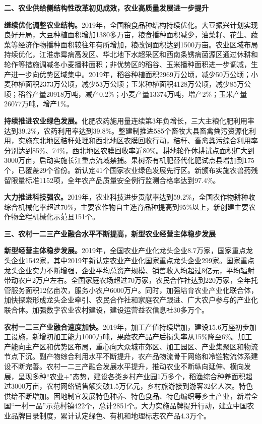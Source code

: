 \documentclass{progbookcn}
\begin{document}
\textbf{二、农业供给侧结构性改革初见成效，农业高质量发展进一步提升}
   
   \textbf{继续优化调整农业结构。}2019年，全国粮食品种结构持续优化。大豆振兴计划实现良好开局，大豆种植面积增加1380多万亩，粮食播种面积减少，油菜籽、花生、蔬菜等经济作物播种面积较往年有所增加，粮改饲面积达到1500万亩。农业区域布局持续优化，江淮赤霉病高发区、华北地下水超采区和西南条锈病菌源区通过休耕和轮作等措施调减冬小麦播种面积；非优势区的稻谷、玉米播种面积进一步调减，生产进一步向优势区域集中。2019年，稻谷种植面积2969万公顷，减少50万公顷；小麦种植面积2373万公顷，减少53万公顷；玉米种植面积4128万公顷，减少85万公顷；稻谷产量20918万吨，减产0.2\%；小麦产量13374万吨，增产2\%；玉米产量26077万吨，增产1\%。
    
    \textbf{持续推进农业绿色发展。}化肥农药施用量连续第3年负增长，三大主粮化肥利用率达到39.2\%，农药利用率达到39.8\%。整建制推进585个畜牧大县畜禽粪污资源化利用，实施东北地区秸秆处理和西北地区农膜回收行动，秸秆、畜禽粪污综合利用率分别达到85\%、74\%，西北地区农膜回收率近80\%。耕地轮作休耕试点面积扩大到3000万亩，启动实施长江重点流域禁捕。果树茶有机肥替代化肥试点县增加到175个，已覆盖29个省份。新认定41个国家农业绿色发展先行区。新颁布实施农兽药残留限量标准1152项，全年农产品质量安全例行监测合格率达到97.4\%。
    
    \textbf{大力推进科技强农。}2019年，农业科技进步贡献率达到59.2\%，全国农作物耕种收综合机械化率超过70\%，主要农作物自主选育品种提高到95\%以上，新创建主要农作物全程机械化示范县151个。

\textbf{三、农村一二三产业融合水平不断提高，新型农业经营主体稳步发展}

    \textbf{新型经营主体稳步发展。}2019年，全国农业产业化龙头企业8.7万家，国家重点龙头企业1542家，其中2019年新认定农业产业化国家重点龙头企业299家。国家重点龙头企业实力不断增强，企业平均总资产规模、销售收入均超过8亿元，平均辐射带动农户2万户左右。全国家庭农场超过70万家，农民合作社达到220万家，全年托管服务面积12亿亩次，服务小农户6000万户。同时，加强培育农业产业化联合体，加快探索形成龙头企业牵引、农民合作社和家庭农产跟进、广大农户参与的产业化联合体。加强数字农业农村建设，建设运营益农信息社30多万个。

    \textbf{农村一二三产业融合速度加快。}2019年，加工产值持续增加，建设15.6万座初步加工设施，新增初加工能力1000万吨，果蔬农产品产后损失率从15\%降至6\%。加工产能向主产区和优势区布局，重心向大众城市郊区、加工园区、产业集聚区和物流节点下沉。副产物综合利用水平不断提升，农产品物流骨干网络和冷链物流体系建设不断完善。农村一二三产融合发展水平提升，推动农业不断纵向延伸、横向发展，呈现多种“农业+”态势，建设各类乡村产业园1万多个，稻渔综合种养面积超过3000万亩，农村网络销售额突破1.5万亿元，乡村旅游接到游客32亿人次。特色供给不断增加。因地制宜发展特色种养、特色食品、特色编织等乡土产业，新增全国“一村一品”示范村镇422个，总计2851个。大力实施品牌提升行动，建立中国农业品牌目录制度，累计认定绿色、有机和地理标志农产品4.3万个。
\end{document}
